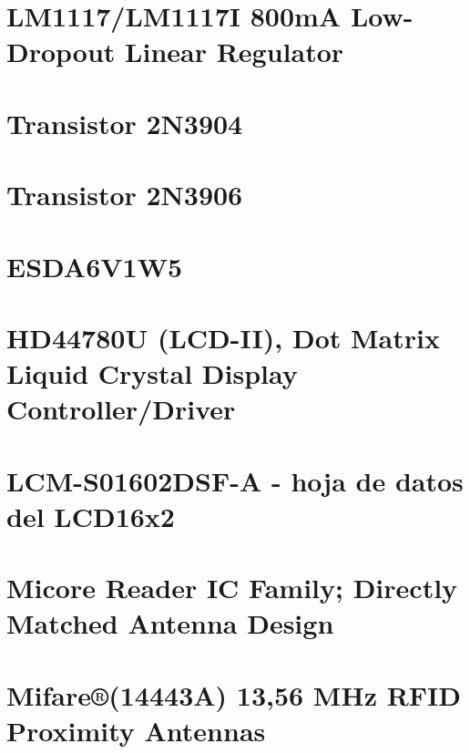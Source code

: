 \section{LM1117/LM1117I 800mA Low-Dropout Linear Regulator}


\section{Transistor 2N3904}


\section{Transistor 2N3906}


\section{ESDA6V1W5}


\section{HD44780U (LCD-II), Dot Matrix Liquid Crystal Display Controller/Driver}


\section{LCM-S01602DSF-A - hoja de datos del LCD16x2}


\section{Micore Reader IC Family; Directly Matched Antenna Design}


\section{Mifare®(14443A) 13,56 MHz RFID Proximity Antennas}


